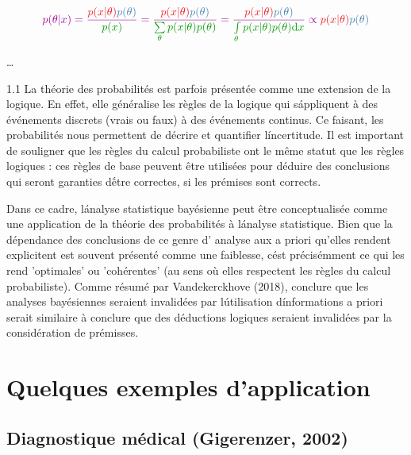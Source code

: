 \documentclass[
  a4paper,11pt,twoside,onecolumn,openright,final,oldfontcommands]{memoir}
\theoremstyle{definition}
\theoremstyle{definition}
\theoremstyle{definition}
\theoremstyle{remark}
\begin{document}
\[
\color{purple}{p(\theta \vert x)} = \dfrac{\color{orangered}{p(x\vert \theta)} \color{steelblue}{p(\theta)}}{\color{green}{p(x)}} = \dfrac{\color{orangered}{p(x\vert \theta)} \color{steelblue}{p(\theta)}}{\color{green}{\sum\limits_{\theta}p(x|\theta)p(\theta)}} = \dfrac{\color{orangered}{p(x\vert \theta)} \color{steelblue}{p(\theta)}}{\color{green}{\int\limits_{\theta}p(x|\theta)p(\theta)\mathrm{d}x}} \propto \color{orangered}{p(x\vert \theta)} \color{steelblue}{p(\theta)}
\]

\ldots{}

\begin{keyconcepts}{1.1}
La théorie des probabilités est parfois présentée comme une extension de la logique. En effet, elle généralise les règles de la logique qui s\' appliquent à des événements discrets (vrais ou faux) à des événements continus. Ce faisant, les probabilités nous permettent de décrire et quantifier l\' incertitude. Il est important de souligner que les règles du calcul probabiliste ont le même statut que les règles logiques : ces règles de base peuvent être utilisées pour déduire des conclusions qui seront garanties d\' être correctes, si les prémises sont corrects.

Dans ce cadre, l\' analyse statistique bayésienne peut être conceptualisée comme une application de la théorie des probabilités à l\'analyse statistique. Bien que la dépendance des conclusions de ce genre d' analyse aux a priori qu'elles rendent explicitent est souvent présenté comme une faiblesse, c\'est précisémment ce qui les rend 'optimales' ou 'cohérentes' (au sens où elles respectent les règles du calcul probabiliste). Comme résumé par Vandekerckhove (2018), conclure que les analyses bayésiennes seraient invalidées par l\' utilisation d\' informations a priori serait similaire à conclure que des déductions logiques seraient invalidées par la considération de prémisses.
\end{keyconcepts}

\hypertarget{quelques-exemples-dapplication}{%
\section{Quelques exemples d'application}\label{quelques-exemples-dapplication}}

\hypertarget{diagnostique-muxe9dical-gigerenzer-2002}{%
\subsection{Diagnostique médical (Gigerenzer, 2002)}\label{diagnostique-muxe9dical-gigerenzer-2002}}
\end{document}
